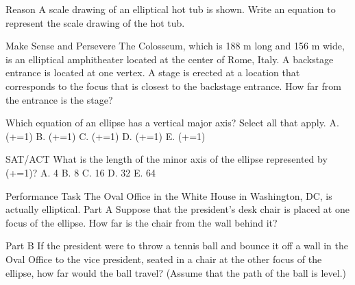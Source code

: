 \documentclass{article}
\newenvironment{practice}[2]{}{}        %
\newcommand{\answer}[1]{}               %
\newcommand{\placeholder}[2]{}          %
\begin{document}
\begin{practice}{25}{2}
Reason A scale drawing of an elliptical hot tub is shown. Write an equation to represent the scale drawing of the hot tub.
\placeholder{graph}{Grid spacing 2, x window [-8,12], y [-12,8], black x/y axes arrows and O origin; x labels -4,4,8; y 4,-4,-8. Red vertical ellipse center (2,-2), vertices (2,6),(2,-10), co-vertices (-4,-2),(8,-2).}
\answer{(\frac{(x-2)^2}{36}+\frac{(y+2)^2}{64}=1)}
\end{practice}
\begin{practice}{26}{2}
Make Sense and Persevere The Colosseum, which is 188 m long and 156 m wide, is an elliptical amphitheater located at the center of Rome, Italy. A backstage entrance is located at one vertex. A stage is erected at a location that corresponds to the focus that is closest to the backstage entrance. How far from the entrance is the stage?
\placeholder{photo}{Aerial view of the oval Colosseum with long axis vertical. White point at top vertex labeled Backstage entrance; white point inside upper half labeled Stage.}
\answer{about 41.5 m}
\end{practice}
\begin{practice}{27}{1}
Which equation of an ellipse has a vertical major axis? Select all that apply.
A. (+=1)
B. (+=1)
C. (+=1)
D. (+=1)
E. (+=1)
\answer{A, C, E}
\end{practice}
\begin{practice}{28}{1}
SAT/ACT What is the length of the minor axis of the ellipse represented by (+=1)?
A. 4
B. 8
C. 16
D. 32
E. 64
\answer{B}
\end{practice}
\begin{practice}{29}{2}
Performance Task The Oval Office in the White House in Washington, DC, is actually elliptical.
Part A Suppose that the president's desk chair is placed at one focus of the ellipse. How far is the chair from the wall behind it?
\answer{88.7 in. or 7.4 ft}
Part B If the president were to throw a tennis ball and bounce it off a wall in the Oval Office to the vice president, seated in a chair at the other focus of the ellipse, how far would the ball travel? (Assume that the path of the ball is level.)
\answer{430 in. or 35.8 ft}
\placeholder{photo}{Oval Office with chairs foreground and desk at back. White double-headed horizontal arrow labeled Minor axis 29 ft; vertical arrow labeled Major axis 35 ft 10 in.}
\end{practice}
\end{document}
